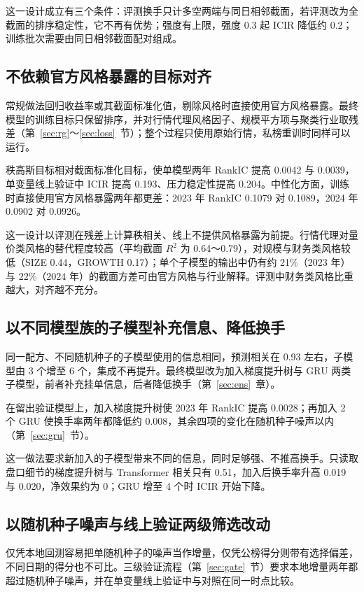 \documentclass[UTF8,a4paper,zihao=-4,fontset=none]{ctexart}
\begin{document}
这一设计成立有三个条件：评测换手只计多空两端与同日相邻截面，若评测改为全截面的排序稳定性，它不再有优势；强度有上限，强度 0.3 起 ICIR 降低约 0.2；训练批次需要由同日相邻截面配对组成。

\subsection{不依赖官方风格暴露的目标对齐}

常规做法回归收益率或其截面标准化值，剔除风格时直接使用官方风格暴露。最终模型的训练目标只保留排序，并对行情代理风格因子、规模平方项与聚类行业取残差（第~\ref{sec:rg}～\ref{sec:loss}~节）；整个过程只使用原始行情，私榜重训时同样可以运行。

秩高斯目标相对截面标准化目标，使单模型两年 RankIC 提高 0.0042 与 0.0039，单变量线上验证中 ICIR 提高 0.193、压力稳定性提高 0.204。中性化方面，训练时直接使用官方风格暴露两年都更差：2023 年 RankIC 0.1079 对 0.1089，2024 年 0.0902 对 0.0926。

这一设计以评测在残差上计算秩相关、线上不提供风格暴露为前提。行情代理对量价类风格的替代程度较高（平均截面 $R^2$ 为 0.64～0.79），对规模与财务类风格较低（SIZE 0.44，GROWTH 0.17）；单个子模型的输出中仍有约 21\%（2023 年）与 22\%（2024 年）的截面方差可由官方风格与行业解释。评测中财务类风格比重越大，对齐越不充分。

\subsection{以不同模型族的子模型补充信息、降低换手}

同一配方、不同随机种子的子模型使用的信息相同，预测相关在 0.93 左右，子模型由 3 个增至 6 个，集成不再提升。最终模型改为加入梯度提升树与 GRU 两类子模型，前者补充挂单信息，后者降低换手（第~\ref{sec:ens}~章）。

在留出验证模型上，加入梯度提升树使 2023 年 RankIC 提高 0.0028；再加入 2 个 GRU 使换手率两年都降低约 0.008，其余四项的变化在随机种子噪声以内（第~\ref{sec:gru}~节）。

这一做法要求新加入的子模型带来不同的信息，同时足够强、不推高换手。只读取盘口细节的梯度提升树与 Transformer 相关只有 0.51，加入后换手率升高 0.019 与 0.020，净效果约为 0；GRU 增至 4 个时 ICIR 开始下降。

\subsection{以随机种子噪声与线上验证两级筛选改动}

仅凭本地回测容易把单随机种子的噪声当作增量，仅凭公榜得分则带有选择偏差，不同日期的得分也不可比。三级验证流程（第~\ref{sec:gate}~节）要求本地增量两年都超过随机种子噪声，并在单变量线上验证中与对照在同一时点比较。
\end{document}
